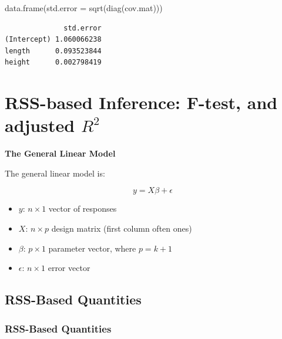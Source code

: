 \documentclass[
  letterpaper,
  DIV=11,
  numbers=noendperiod]{scrreprt}
\newenvironment{Shaded}{\begin{snugshade}}{\end{snugshade}}
\newcommand{\AttributeTok}[1]{\textcolor[rgb]{0.40,0.45,0.13}{#1}}
\newcommand{\FunctionTok}[1]{\textcolor[rgb]{0.28,0.35,0.67}{#1}}
\newcommand{\NormalTok}[1]{\textcolor[rgb]{0.00,0.23,0.31}{#1}}
\providecommand{\tightlist}{%
  \setlength{\itemsep}{0pt}\setlength{\parskip}{0pt}}\usepackage{longtable,booktabs,array}
\begin{document}
\begin{Shaded}
\begin{Highlighting}[]
\FunctionTok{data.frame}\NormalTok{(}\AttributeTok{std.error =} \FunctionTok{sqrt}\NormalTok{(}\FunctionTok{diag}\NormalTok{(cov.mat)))}
\end{Highlighting}
\end{Shaded}

\begin{verbatim}
              std.error
(Intercept) 1.060066238
length      0.093523844
height      0.002798419
\end{verbatim}

\section{\texorpdfstring{RSS-based Inference: F-test, and adjusted
\(R^2\)}{RSS-based Inference: F-test, and adjusted R\^{}2}}\label{rss-based-inference-f-test-and-adjusted-r2}

\textbf{The General Linear Model}

The general linear model is:

\[y = X\beta + \epsilon\]

\begin{itemize}
\tightlist
\item
  \(y\): \(n \times 1\) vector of responses
\item
  \(X\): \(n \times p\) design matrix (first column often ones)
\item
  \(\beta\): \(p \times 1\) parameter vector, where \(p=k+1\)
\item
  \(\epsilon\): \(n \times 1\) error vector
\end{itemize}

\subsection{RSS-Based Quantities}\label{rss-based-quantities}

\subsubsection{RSS-Based Quantities}\label{rss-based-quantities-1}
\end{document}
